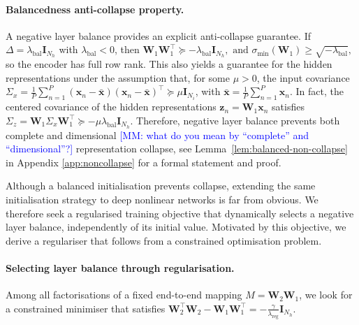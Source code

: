 \documentclass{article} %
\newcommand{\wa}{\mathbf{W}_1}
\newcommand{\wb}{\mathbf{W}_2}
\theoremstyle{remark}
\newcommand{\mm}[1]{\textcolor{blue}{[MM: #1]}}
\begin{document}
\paragraph{Balancedness anti-collapse property.}
A negative layer balance provides an explicit anti-collapse guarantee.
If $\Delta=\lambda_{\mathrm{bal}}\mathbf{I}_{N_h}$ with
$\lambda_{\mathrm{bal}}<0$, then
$
\wa\wa^\top\succeq-\lambda_{\mathrm{bal}}\mathbf{I}_{N_h},
 \text{ and }
\sigma_{\min}(\wa)\geq\sqrt{-\lambda_{\mathrm{bal}}},
$
so the encoder has full row rank. This also yields a guarantee for
the hidden representations under the assumption that, for some $\mu>0$, the input
covariance $\Sigma_x
=
\frac{1}{P}\sum_{n=1}^{P}
(\mathbf{x}_n-\bar{\mathbf{x}})
(\mathbf{x}_n-\bar{\mathbf{x}})^\top \succeq\mu\mathbf{I}_{N_i}$, with $ 
\bar{\mathbf{x}}=\frac{1}{P}\sum_{n=1}^{P}\mathbf{x}_n$.
In fact, the centered covariance of the hidden representations
$\mathbf{z}_n=\wa\mathbf{x}_n$ satisfies $\Sigma_z
=
\wa\Sigma_x\wa^\top
\succeq
-\mu\lambda_{\mathrm{bal}}\mathbf{I}_{N_h}.$
Therefore, negative layer balance prevents both complete and dimensional \mm{what do you mean by ``complete'' and ``dimensional''?} representation collapse, see Lemma~\ref{lem:balanced-non-collapse} in Appendix \ref{app:noncollapse} for a formal statement and proof.

Although a balanced initialisation prevents collapse, extending the same initialisation strategy to deep nonlinear networks is far from obvious. We therefore seek a regularised training objective that dynamically selects a negative layer balance, independently of its initial value. Motivated by this objective, we derive a regulariser that follows from a constrained optimisation problem. 

\paragraph{Selecting layer balance through regularisation.}

Among all factorisations of a fixed end-to-end mapping
$M=\wb\wa$, we look for a constrained minimiser that satisfies
$
\wb^\top\wb-\wa\wa^\top
=
-\frac{\gamma}{\lambda_{\mathrm{reg}}}
\mathbf{I}_{N_h}.$

\end{document}
